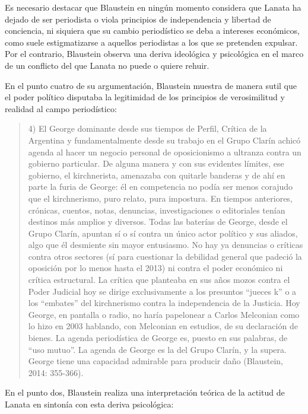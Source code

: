 Es necesario destacar que Blaustein en ningún momento considera que Lanata ha dejado de ser periodista o viola principios de independencia y libertad de conciencia, ni siquiera que su cambio periodístico se deba a intereses económicos, como suele estigmatizarse a aquellos periodistas a los que se pretenden expulsar. Por el contrario, Blaustein observa una deriva ideológica y psicológica en el marco de un conflicto del que Lanata no puede o quiere rehuir.

En el punto cuatro de su argumentación, Blaustein muestra de manera sutil que el poder político disputaba la legitimidad de los principios de verosimilitud y realidad al campo periodístico:

\begin{quote}
4) El George dominante desde sus tiempos de Perfil, Crítica de la Argentina y fundamentalmente desde su trabajo en el Grupo Clarín achicó agenda al hacer un negocio personal de oposicionismo a ultranza contra un gobierno particular. De alguna manera y con sus evidentes límites, ese gobierno, el kirchnerista, amenazaba con quitarle banderas y de ahí en parte la furia de George: él en competencia no podía ser menos corajudo que el kirchnerismo, puro relato, pura impostura. En tiempos anteriores, crónicas, cuentos, notas, denuncias, investigaciones o editoriales tenían destinos más amplios y diversos. Todas las baterías de George, desde el Grupo Clarín, apuntan sí o sí contra un único actor político y sus aliados, algo que él desmiente sin mayor entusiasmo. No hay ya denuncias o críticas contra otros sectores (sí para cuestionar la debilidad general que padeció la oposición por lo menos hasta el 2013) ni contra el poder económico ni crítica estructural. La crítica que planteaba en sus años mozos contra el Poder Judicial hoy se dirige exclusivamente a los presuntos ``jueces k'' o a los ``embates'' del kirchnerismo contra la independencia de la Justicia. Hoy George, en pantalla o radio, no haría papelonear a Carlos Melconian como lo hizo en 2003 hablando, con Melconian en estudios, de su declaración de bienes. La agenda periodística de George es, puesto en sus palabras, de ``uso mutuo''. La agenda de George es la del Grupo Clarín, y la supera. George tiene una capacidad admirable para producir daño (Blaustein, 2014: 355-366).
\end{quote}

En el punto dos, Blaustein realiza una interpretación teórica de la actitud de Lanata en sintonía con esta deriva psicológica:

